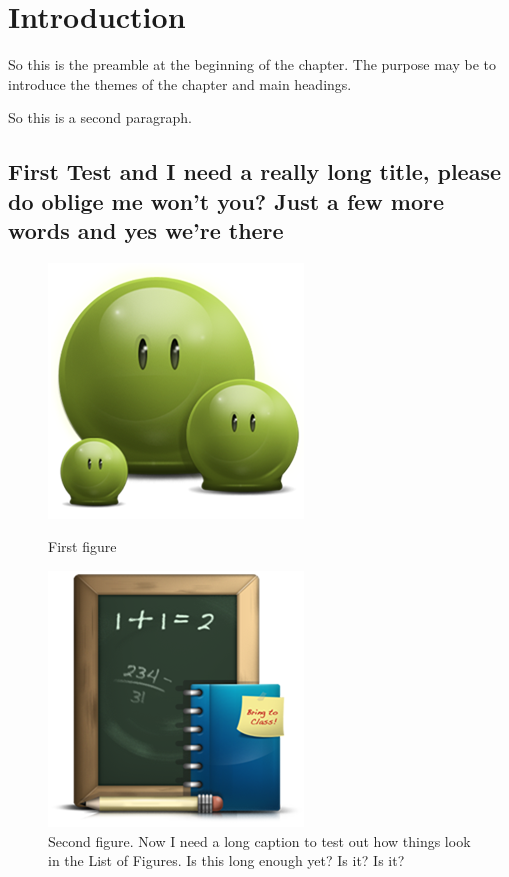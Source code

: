 \chapter{Introduction}

So this is the preamble at the beginning of the chapter. The purpose may be to introduce the themes of the chapter and main headings.

So this is a second paragraph.

\section{First Test and I need a really long title, please do oblige me won't you? Just a few more words and yes we're there}
\lipsum[1-2]

\begin{figure}[hbt!]\centering
\includegraphics[width=.3\textwidth]{green}
\caption[First figure]{First figure\\}

\bigskip

\includegraphics[width=.3\textwidth]{school}
\caption{Second figure. Now I need a long caption to test out how things look in the List of Figures. Is this long enough yet? Is it? Is it?}
\end{figure}

\lipsum[4-5]


